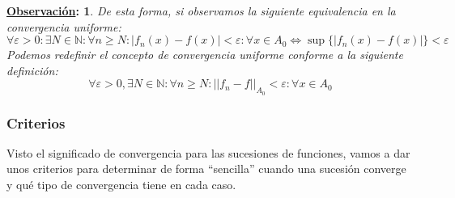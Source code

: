 \documentclass[10pt,a4paper,openright]{book}
\theoremstyle{break}
\newtheorem*{obs}{\underline{Observación}:}
\begin{document}
\begin{obs}
De esta forma, si observamos la siguiente equivalencia en la convergencia uniforme:
$$\forall \varepsilon> 0: \exists N\in \mathbb N: \forall n\geq N : |f_n(x)-f(x)|<\varepsilon : \forall x \in A_0 \Leftrightarrow \sup \{|f_n(x)-f(x)|\}<\varepsilon$$
Podemos redefinir el concepto de convergencia uniforme conforme a la siguiente definición:
$$\forall \varepsilon > 0, \exists N \in \mathbb{N} : \forall n \geq N : ||f_n - f|| _{A_0}< \varepsilon : \forall x \in A_0 $$
\end{obs}

\subsubsection{Criterios}
Visto el significado de convergencia para las sucesiones de funciones, vamos a dar unos criterios para determinar de forma ``sencilla'' cuando una sucesión converge y qué tipo de convergencia tiene en cada caso.
\end{document}
